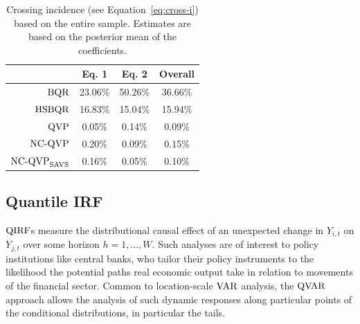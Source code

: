 



\begin{table}[]
\centering
\begin{tabular}{r|ccc}
   & Eq. 1 & Eq. 2 & Overall \\ \hline
$\operatorname{BQR}$ & 23.06\% & 50.26\% & 36.66\% \\
$\operatorname{HSBQR}$ & 16.83\% & 15.04\% & 15.94\% \\ \hdashline
$\operatorname{QVP}$ & 0.05\% & 0.14\% & 0.09\% \\
$\operatorname{NC-QVP}$ & 0.20\% & 0.09\% & 0.15\% \\
$\operatorname{NC-QVP}_{\mathrm{SAVS}}$ & 0.16\% & 0.05\% & 0.10\% \\ \hline
\end{tabular}%
\caption{Crossing incidence (see Equation~\ref{eq:cross-i}) based on the entire sample. Estimates are based on the posterior mean of the coefficients.}
\label{tab:cross-in-sample}
\end{table}

\subsection{Quantile IRF}
%
$\operatorname{QIRF}$s measure the distributional causal effect of an unexpected change in $Y_{i,t}$ on $Y_{j,t}$ over some horizon $h = 1,\dotsc,W$. Such analyses are of interest to policy institutions like central banks, who tailor their policy instruments to the likelihood the potential paths real economic output take in relation to movements of the financial sector. Common to location-scale $\operatorname{VAR}$ analysis, the $\operatorname{QVAR}$ approach allows the analysis of such dynamic responses along particular points of the conditional distributions, in particular the tails.
%  
%

